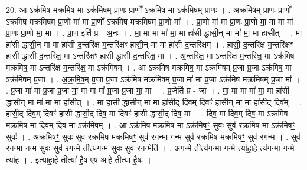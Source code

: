 \documentclass[17pt]{extarticle}
\begin{document}
20. आ ऽक्र॑मिष मक्रमिष॒ मा ऽक्र॑मिषम् प्रा॒णः प्रा॒णो᳚ ऽक्रमिष॒ मा ऽक्र॑मिषम् प्रा॒णः । . अ॒क्र॒मि॒ष॒म् प्रा॒णः प्रा॒णो᳚ ऽक्रमिष मक्रमिषम् प्रा॒णो मा॑ मा प्रा॒णो᳚ ऽक्रमिष मक्रमिषम् प्रा॒णो मा᳚ । . प्रा॒णो मा॑ मा प्रा॒णः प्रा॒णो मा॒ मा मा मा᳚ प्रा॒णः प्रा॒णो मा॒ मा । . प्रा॒ण इति॑ प्र - अ॒नः । . मा॒ मा मा मा॑ मा॒ मा हा॑सी द्धासी॒न् मा मा॑ मा॒ मा हा॑सीत् । . मा हा॑सी द्धासी॒न् मा मा हा॑सी द॒न्तरि॑क्ष म॒न्तरि॑क्षꣳ हासी॒न् मा मा हा॑सी द॒न्तरि॑क्षम् । . हा॒सी॒ द॒न्तरि॑क्ष म॒न्तरि॑क्षꣳ हासी द्धासी द॒न्तरि॑क्ष॒ मा ऽन्तरि॑क्षꣳ हासी द्धासी द॒न्तरि॑क्ष॒ मा । . अ॒न्तरि॑क्ष॒ मा ऽन्तरि॑क्ष म॒न्तरि॑क्ष॒ मा ऽक्र॑मिष मक्रमिष॒ मा ऽन्तरि॑क्ष म॒न्तरि॑क्ष॒ मा ऽक्र॑मिषम् । . आ ऽक्र॑मिष मक्रमिष॒ मा ऽक्र॑मिषम् प्र॒जा प्र॒जा ऽक्र॑मिष॒ मा ऽक्र॑मिषम् प्र॒जा । . अ॒क्र॒मि॒ष॒म् प्र॒जा प्र॒जा ऽक्र॑मिष मक्रमिषम् प्र॒जा मा॑ मा प्र॒जा ऽक्र॑मिष मक्रमिषम् प्र॒जा मा᳚ । . प्र॒जा मा॑ मा प्र॒जा प्र॒जा मा॒ मा मा मा᳚ प्र॒जा प्र॒जा मा॒ मा । . प्र॒जेति॑ प्र - जा । . मा॒ मा मा मा॑ मा॒ मा हा॑सी द्धासी॒न् मा मा॑ मा॒ मा हा॑सीत् । . मा हा॑सी द्धासी॒न् मा मा हा॑सी॒द् दिव॒म् दिवꣳ॑ हासी॒न् मा मा हा॑सी॒द् दिव᳚म् । . हा॒सी॒द् दिव॒म् दिवꣳ॑ हासी द्धासी॒द् दिव॒ मा दिवꣳ॑ हासी द्धासी॒द् दिव॒ मा । . दिव॒ मा दिव॒म् दिव॒ मा ऽक्र॑मिष मक्रमिष॒ मा दिव॒म् दिव॒ मा ऽक्र॑मिषम् । . आ ऽक्र॑मिष मक्रमिष॒ मा ऽक्र॑मिषꣳ॒॒ सुवः॒ सुव॑ रक्रमिष॒ मा ऽक्र॑मिषꣳ॒॒ सुवः॑ । . अ॒क्र॒मि॒षꣳ॒॒ सुवः॒ सुव॑ रक्रमिष मक्रमिषꣳ॒॒ सुव॑ रगन्मा गन्म॒ सुव॑ रक्रमिष मक्रमिषꣳ॒॒ सुव॑ रगन्म । . सुव॑ रगन्मा गन्म॒ सुवः॒ सुव॑ रग॒न्मे तीत्य॑गन्म॒ सुवः॒ सुव॑ रग॒न्मेति॑ । . अ॒ग॒न्मे तीत्य॑गन्मा ग॒न्मे त्या॑हा॒हे त्य॑गन्मा ग॒न्मे त्या॑ह । . इत्या॑हा॒हे तीत्या॑ है॒ष ए॒ष आ॒हे तीत्या॑ है॒षः । \newline
\end{document}
